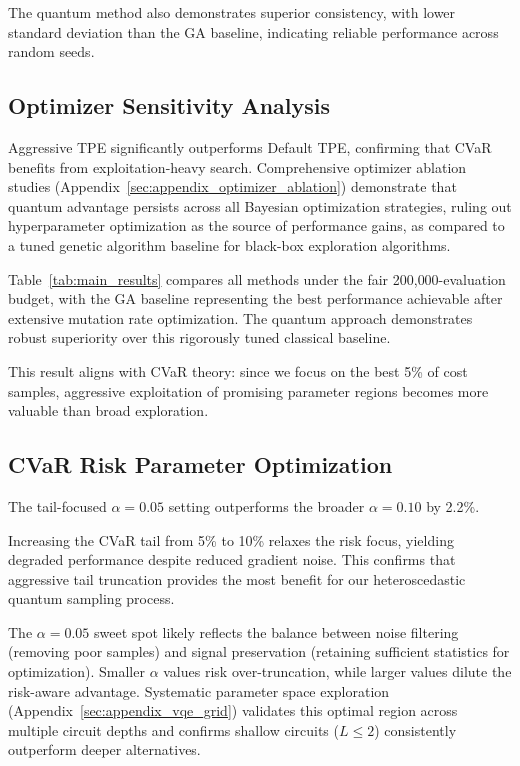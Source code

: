 The quantum method also demonstrates superior consistency, with lower 
standard deviation than the GA baseline, indicating reliable 
performance across random seeds.

\subsection{Optimizer Sensitivity Analysis}

Aggressive TPE significantly outperforms Default TPE, confirming that CVaR 
benefits from exploitation-heavy search. Comprehensive optimizer ablation studies 
(Appendix~\ref{sec:appendix_optimizer_ablation}) demonstrate that quantum advantage persists across all Bayesian optimization strategies, ruling out hyperparameter optimization as the source of performance gains, as compared to a tuned genetic algorithm baseline for black-box exploration algorithms.

Table~\ref{tab:main_results} compares all methods under the fair 
200{,}000-evaluation budget, with the GA baseline representing the best performance achievable after extensive mutation rate optimization. The quantum approach demonstrates robust superiority over this rigorously tuned classical baseline.



This result aligns with CVaR theory: since we focus on the best 5\% of cost 
samples, aggressive exploitation of promising parameter regions becomes more 
valuable than broad exploration.

\subsection{CVaR Risk Parameter Optimization}

The tail-focused $\alpha=0.05$ setting outperforms the broader $\alpha=0.10$ 
by 2.2\%.

Increasing the CVaR tail from 5\% to 10\% relaxes the risk focus, 
yielding degraded performance despite reduced gradient noise. This confirms that aggressive tail truncation provides the 
most benefit for our heteroscedastic quantum sampling process.

The $\alpha=0.05$ sweet spot likely reflects the balance between noise filtering 
(removing poor samples) and signal preservation (retaining sufficient statistics 
for optimization). Smaller $\alpha$ values risk over-truncation, while larger 
values dilute the risk-aware advantage. Systematic parameter space exploration 
(Appendix~\ref{sec:appendix_vqe_grid}) validates this optimal region across 
multiple circuit depths and confirms shallow circuits ($L \leq 2$) consistently 
outperform deeper alternatives.

